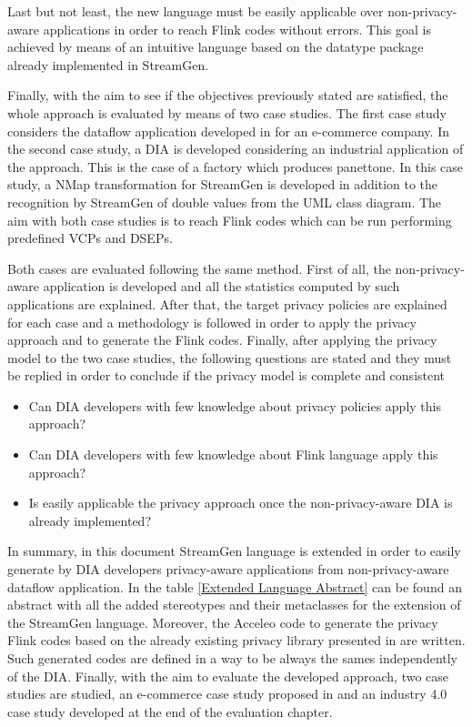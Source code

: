 Last but not least, the new language must be easily applicable over non-privacy-aware applications in order to reach Flink codes without errors. This goal is achieved by means of an intuitive language based on the datatype package already implemented in StreamGen.

Finally, with the aim to see if the objectives previously stated are satisfied, the whole approach is evaluated by means of two case studies. The first case study considers the dataflow application developed in \cite{privacypoliciesarticle} for an e-commerce company. In the second case study, a DIA is developed considering an industrial application of the approach. This is the case of a factory which produces panettone. In this case study, a NMap transformation for StreamGen is developed in addition to the recognition by StreamGen of double values from the UML class diagram. The aim with both case studies is to reach Flink codes which can be run performing predefined VCPs and DSEPs.

Both cases are evaluated following the same method. First of all, the non-privacy-aware application is developed and all the statistics computed by such applications are explained. After that,  the target privacy policies are explained for each case and a methodology is followed in order to apply the privacy approach and to generate the Flink codes. Finally, after applying the privacy model to the two case studies, the following questions are stated and they must be replied in order to conclude if the privacy model is complete and consistent

\begin{itemize} %
\item Can DIA developers with few knowledge about privacy policies apply this approach?
\item Can DIA developers with few knowledge about Flink language apply this approach?
\item Is easily applicable the privacy approach once the non-privacy-aware DIA is already implemented?
\end{itemize}

In summary, in this document StreamGen language is extended in order to easily generate by DIA developers privacy-aware applications from non-privacy-aware dataflow application. In the table \ref{Extended Language Abstract} can be found an abstract with all the added stereotypes and their metaclasses for the extension of the StreamGen language. Moreover, the Acceleo code to generate the privacy Flink codes based on the already existing privacy library presented in \cite{privacypoliciesarticle} are written. Such generated codes are defined in a way to be always the sames independently of the DIA. Finally, with the aim to evaluate the developed approach, two case studies are studied, an e-commerce case study proposed in \cite{privacypoliciesarticle} and an industry 4.0 case study developed at the end of the evaluation chapter.

